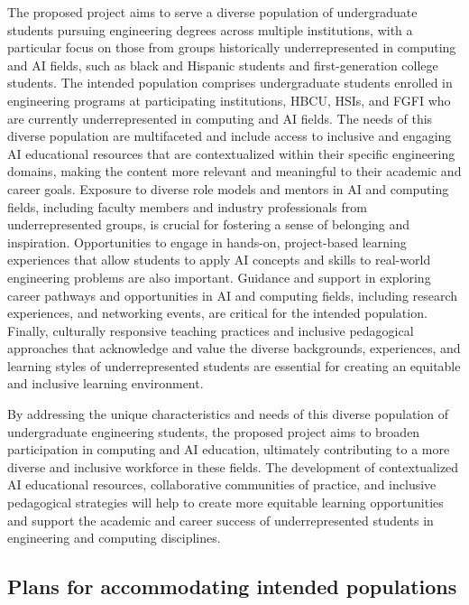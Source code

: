 \documentclass[11pt]{article}
\begin{document}
The proposed project aims to serve a diverse population of undergraduate students pursuing engineering degrees across multiple institutions, with a particular focus on those from groups historically underrepresented in computing and AI fields, such as black and Hispanic students and first-generation college students. 
The intended population comprises undergraduate students enrolled in engineering programs at participating institutions, HBCU, HSIs, and FGFI who are currently underrepresented in computing and AI fields. 
The needs of this diverse population are multifaceted and include access to inclusive and engaging AI educational resources that are contextualized within their specific engineering domains, making the content more relevant and meaningful to their academic and career goals. 
Exposure to diverse role models and mentors in AI and computing fields, including faculty members and industry professionals from underrepresented groups, is crucial for fostering a sense of belonging and inspiration. 
Opportunities to engage in hands-on, project-based learning experiences that allow students to apply AI concepts and skills to real-world engineering problems are also important. 
Guidance and support in exploring career pathways and opportunities in AI and computing fields, including research experiences, and networking events, are critical for the intended population. 
Finally, culturally responsive teaching practices and inclusive pedagogical approaches that acknowledge and value the diverse backgrounds, experiences, and learning styles of underrepresented students are essential for creating an equitable and inclusive learning environment.  

By addressing the unique characteristics and needs of this diverse population of undergraduate engineering students, the proposed project aims to broaden participation in computing and AI education, ultimately contributing to a more diverse and inclusive workforce in these fields. The development of contextualized AI educational resources, collaborative communities of practice, and inclusive pedagogical strategies will help to create more equitable learning opportunities and support the academic and career success of underrepresented students in engineering and computing disciplines.

\subsection{Plans for accommodating intended populations}
\end{document}
